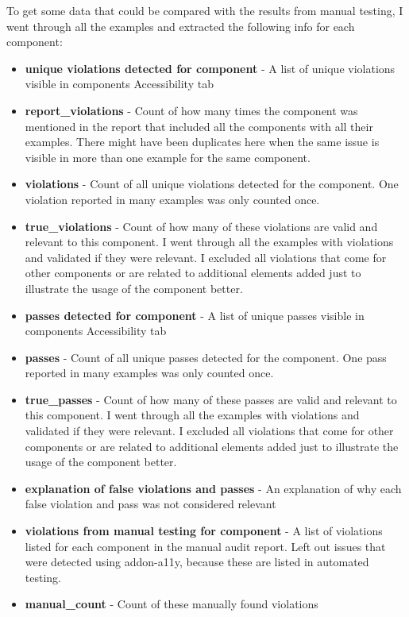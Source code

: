 \documentclass{master_thesis}
\begin{document}
To get some data that could be compared with the results from manual testing, I went through all the examples and extracted the following info for each component:
\begin{itemize}
	\item \textbf{unique violations detected for component} - A list of unique violations visible in components Accessibility tab
	\item \textbf{report\_violations} - Count of how many times the component was mentioned in the report that included all the components with all their examples. There might have been duplicates here when the same issue is visible in more than one example for the same component.
	\item \textbf{violations} - Count of all unique violations detected for the component. One violation reported in many examples was only counted once.
	\item \textbf{true\_violations} - Count of how many of these violations are valid and relevant to this component. I went through all the examples with violations and validated if they were relevant.  I excluded all violations that come for other components or are related to additional elements added just to illustrate the usage of the component better.
	\item \textbf{passes detected for component} - A list of unique passes visible in components Accessibility tab
	\item \textbf{passes} - Count of all unique passes detected for the component. One pass reported in many examples was only counted once.
	\item \textbf{true\_passes} - Count of how many of these passes are valid and relevant to this component. I went through all the examples with violations and validated if they were relevant. I excluded all violations that come for other components or are related to additional elements added just to illustrate the usage of the component better.
	\item \textbf{explanation of false violations and passes} - An explanation of why each false violation and pass was not considered relevant
	\item \textbf{violations from manual testing for component} - A list of violations listed for each component in the manual audit report. Left out issues that were detected using addon-a11y, because these are listed in automated testing.
	\item \textbf{manual\_count} - Count of these manually found violations
\end{itemize}
\end{document}
